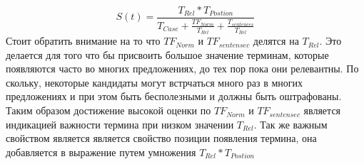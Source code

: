 \begin{equation}
	\label{eq:termin_score}
	S(t) = \frac{T_{Rel} * T_{Postion}}{T_{Case} + \frac{TF_{Norm}}{T_{Rel}} + \frac{T_{sentences}}{T_{Rel}}}
\end{equation}
Стоит обратить внимание на то что $TF_{Norm}$ и $TF_{sentensec}$ делятся на $T_{Rel}$.
Это делается для того что бы присвоить большое значение терминам, которые появляются часто во многих предложениях, до тех пор пока они релевантны.
По скольку, некоторые кандидаты могут встрчаться много раз в многих предложениях и при этом быть бесполезными и должны быть оштрафованы.
Таким образом достижение высокой оценки по $TF_{Norm}$ и $TF_{sentensec}$ является индикацией важности термина при низком значении $T_{Rel}$.
Так же важным свойством является является свойство позиции появления термина, она добавляется в выражение путем умножения $T_{Rel} * T_{Postion}$

